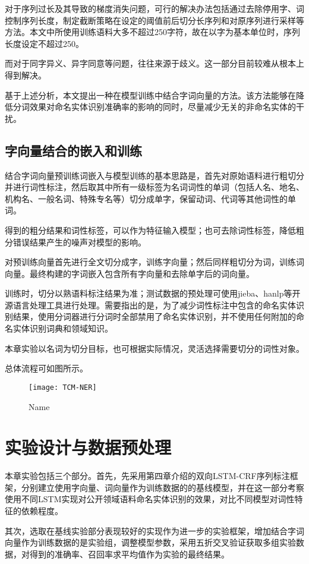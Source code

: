 对于序列过长及其导致的梯度消失问题，可行的解决办法包括通过去除停用字、词控制序列长度，制定截断策略在设定的阈值前后切分长序列和对原序列进行采样等方法。本文中所使用训练语料大多不超过250字符，故在以字为基本单位时，序列长度设定不超过250。

而对于同字异义、异字同意等问题，往往来源于歧义。这一部分目前较难从根本上得到解决。

基于上述分析，本文提出一种在模型训练中结合字词向量的方法。该方法能够在降低分词效果对命名实体识别准确率的影响的同时，尽量减少无关的非命名实体的干扰。
\subsection{字向量结合的嵌入和训练}
\label{subsec:combine_word_char}
结合字词向量预训练词嵌入与模型训练的基本思路是，首先对原始语料进行粗切分并进行词性标注，然后取其中所有一级标签为名词词性的单词（包括人名、地名、机构名、一般名词、特殊专名等）切分成单字，保留动词、代词等其他词性的单词。

得到的粗分结果和词性标签，可以作为特征输入模型；也可去除词性标签，降低粗分错误结果产生的噪声对模型的影响。

对预训练向量首先进行全文切分成字，训练字向量；然后同样粗切分为词，训练词向量。最终构建的字词嵌入包含所有字向量和去除单字后的词向量。

训练时，切分以熟语料标注结果为准；测试数据的预处理可使用jieba、hanlp等开源语言处理工具进行处理。需要指出的是，为了减少词性标注中包含的命名实体识别结果，使用分词器进行分词时全部禁用了命名实体识别，并不使用任何附加的命名实体识别词典和领域知识。

本章实验以名词为切分目标，也可根据实际情况，灵活选择需要切分的词性对象。

总体流程可如图所示。
\begin{figure}[H]
    \centering
    \caption{Name}
    \texttt{[image: TCM-NER]}
    \label{fig:exp_frame}
\end{figure}

\section{实验设计与数据预处理}
本章实验包括三个部分。首先，先采用第四章介绍的双向LSTM-CRF序列标注框架，分别建立使用字向量、词向量作为训练数据的的基线模型，并在这一部分考察使用不同LSTM实现对公开领域语料命名实体识别的效果，对比不同模型对词性特征的依赖程度。

其次，选取在基线实验部分表现较好的实现作为进一步的实验框架，增加结合字词向量作为训练数据的是实验组，调整模型参数，采用五折交叉验证获取多组实验数据，对得到的准确率、召回率求平均值作为实验的最终结果。

